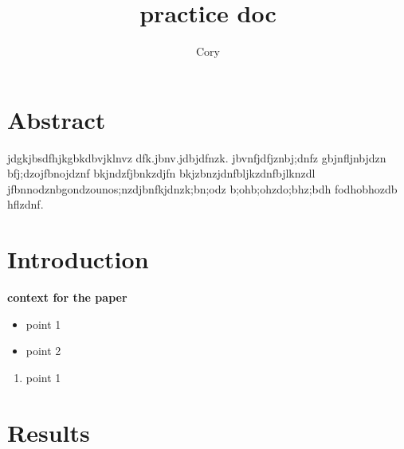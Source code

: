 \documentclass{article}
\begin{document}


\title{practice doc}
\author{Cory}
\maketitle
\tableofcontents

\section*{Abstract}

jdgkjbsdfhjkgbkdbvjklnvz dfk.jbnv.jdbjdfnzk. jbvnfjdfjznbj;dnfz gbjnfljnbjdzn bfj;dzojfbnojdznf bkjndzfjbnkzdjfn bkjzbnzjdnfbljkzdnfbjlknzdl jfbnnodznbgondzounos;nzdjbnfkjdnzk;bn;odz b;ohb;ohzdo;bhz;bdh fodhobhozdb hflzdnf. 


\section{Introduction}

\textbf{context for the paper}

\begin{itemize}
  \item point 1
  \item point 2
\end{itemize}

\begin{enumerate}
  \item point 1 
\end{enumerate}

\section{Results}
\end{document}
